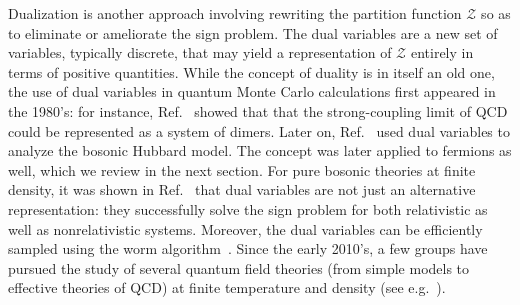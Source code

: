 \documentclass[../main.tex]{subfiles}
\begin{document}
Dualization is another approach involving rewriting the partition function $\mathcal Z$ so as to eliminate or ameliorate the sign problem.
The dual variables are a new set of variables, typically discrete, that may yield a representation of $\mathcal Z$ entirely in terms of positive quantities.
While the concept of duality is in itself an old one, the use of dual variables in quantum Monte Carlo calculations first appeared in the 1980's: for instance, Ref.~\cite{ROSSI1984105} showed that that the strong-coupling limit of QCD could be represented as a system of dimers.
Later on, Ref.~\cite{PhysRevB.61.10725} used dual variables to analyze the bosonic Hubbard model. The concept was later applied
to fermions as well, which we review in the next section. For pure bosonic theories at finite density, it was shown in Ref.~\cite{PhysRevD.75.065012} that dual
variables are not just an alternative representation: they successfully solve the sign problem for both relativistic as well as nonrelativistic systems. Moreover,
the dual variables can be efficiently sampled using the worm algorithm~\cite{PhysRevLett.87.160601, PhysRevE.66.046701}. Since the early 2010's, a few groups have pursued the
study of several quantum field theories (from simple models to effective theories of QCD) at finite temperature and density (see e.g.~\cite{PhysRevD.81.125007, PhysRevLett.106.222001, GATTRINGER2011242, Fromm:2011qi, MERCADO20121920, MERCADO2012737, Gattringer:2012df, Gattringer:2012ap}).
\end{document}
